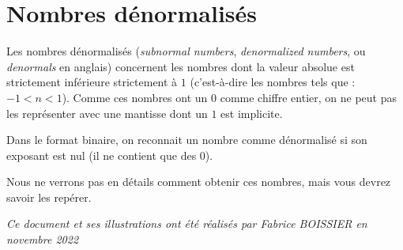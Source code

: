 \documentclass[11pt,a4paper]{article}
\begin{document}
\bigskip


\section{Nombres dénormalisés}

\bigskip

Les nombres dénormalisés (\textit{subnormal numbers}, \textit{denormalized numbers}, ou \textit{denormals} en anglais) concernent les nombres dont la valeur absolue est strictement inférieure strictement à $ 1 $ (c'est-à-dire les nombres tels que : $ -1 < n < 1 $).
Comme ces nombres ont un $ 0 $ comme chiffre entier, on ne peut pas les représenter avec une mantisse dont un  $ 1 $ est implicite.

\medskip

Dans le format binaire, on reconnait un nombre comme dénormalisé si son exposant est nul (il ne contient que des $ 0 $).

\medskip

Nous ne verrons pas en détails comment obtenir ces nombres, mais vous devrez savoir les repérer.



\bigskip

\begin{center}
\textit{Ce document et ses illustrations ont été réalisés par Fabrice BOISSIER en novembre 2022}
\end{center}
\end{document}
